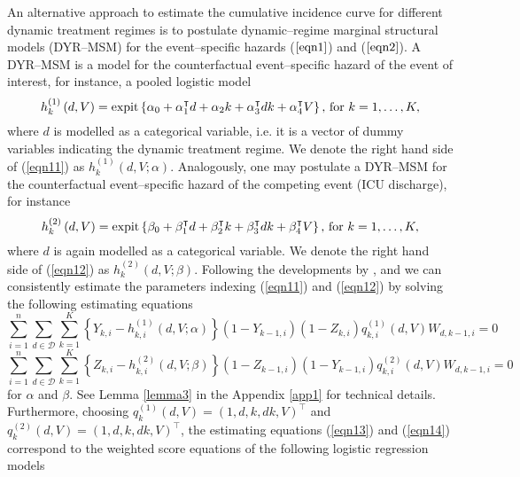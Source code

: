 \documentclass[12pt]{article}
\begin{document}
An alternative approach to estimate the cumulative incidence curve for different dynamic treatment regimes is to postulate dynamic--regime marginal structural models (DYR--MSM) \citep{Murphy2001, VanderLaan2007, Orellana2010} for the event--specific hazards ($\ref{eqn1}$) and ($\ref{eqn2}$). A DYR--MSM is a model for the counterfactual event--specific hazard of the event of interest, for instance, a pooled logistic model 
\begin{equation}
\label{eqn11}
h_k^{(1)} \left(d, V \right) = \text{expit} \left\lbrace \alpha_0 + \alpha_1^\intercal d + \alpha_2 k + \alpha_3^\intercal d k + \alpha_4^\intercal V \right\rbrace \text{, for } k = 1, \dots, K,
\end{equation}
where $d$ is modelled as a categorical variable, i.e. it is a vector of dummy variables indicating the dynamic treatment regime. We denote the right hand side of (\ref{eqn11}) as $h_k^{(1)} \left(d, V; \alpha \right)$. Analogously, one may postulate a DYR--MSM for the counterfactual event--specific hazard of the competing event (ICU discharge), for instance
\begin{equation}
\label{eqn12}
h_k^{(2)} \left(d, V \right) = \text{expit} \left\lbrace \beta_0 + \beta_1^\intercal d + \beta_2^\intercal k + \beta_3^\intercal d k + \beta_4^\intercal V \right\rbrace \text{, for } k = 1, \dots, K,
\end{equation}
where $d$ is again modelled as a categorical variable. We denote the right hand side of (\ref{eqn12}) as $h_k^{(2)} \left(d, V; \beta \right)$. Following the developments by \cite{Orellana2010}, and \cite{VanderLaan2007} we can consistently estimate the parameters indexing (\ref{eqn11}) and (\ref{eqn12}) by solving the following estimating equations 
\begin{equation}
\label{eqn13}
\sum_{i=1}^n \sum_{d \in \mathcal{D}} \sum_{k=1}^{K}  \left\lbrace Y_{k, i} - h_{k,i}^{(1)} \left(d, V; \alpha \right) \right\rbrace \left( 1 - Y_{k-1,i} \right) \left( 1 - Z_{k,i} \right) q_{k,i}^{(1)} \left(d, V \right) W_{d,k-1,i} = 0
\end{equation}
\begin{equation}
\label{eqn14}
\sum_{i=1}^n \sum_{d \in \mathcal{D}} \sum_{k=1}^{K} \left\lbrace Z_{k,i} - h_{k,i}^{(2)} \left(d, V; \beta \right) \right\rbrace \left( 1 - Z_{k-1,i} \right) \left( 1 - Y_{k-1,i} \right) q_{k,i}^{(2)}  \left(d, V \right) W_{d,k-1,i} = 0
\end{equation}
for $\alpha$ and $\beta$. See Lemma \ref{lemma3} in the Appendix \ref{app1} for technical details. Furthermore, choosing $q_k^{(1)} \left(d, V \right) = \left( 1, d, k, d k, V \right)^\intercal$ and $q_k^{(2)} \left(d, V \right) = \left( 1, d, k, d k, V \right)^\intercal$, the estimating equations (\ref{eqn13}) and (\ref{eqn14}) correspond to the weighted score equations of the following logistic regression models
\end{document}
